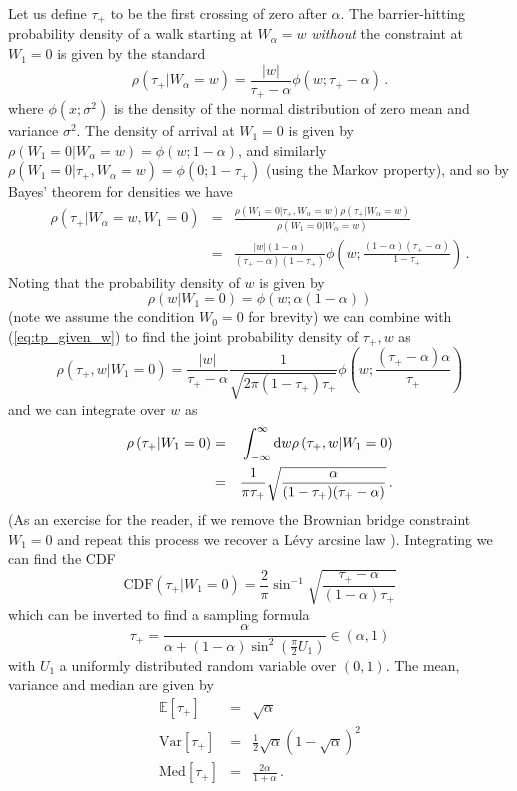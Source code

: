 \documentclass{article}
\newcommand{\tp}{{\tau_{\mathrm{+}}}}
\newcommand{\Var}{\mathrm{Var}}
\newcommand{\Med}{\mathrm{Med}}
\begin{document}
Let us define $\tp$ to be the first crossing of zero after $\alpha$. The barrier-hitting probability density of a walk starting at $W_\alpha=w$ \emph{without} the constraint at $W_1=0$ is given by the standard
\begin{equation}
\rho\left(\tp | W_\alpha=w\right) = \frac{|w|}{\tp - \alpha}\phi\left(w;\tp - \alpha \right) \, .
\end{equation}
where $\phi(x;\sigma^2)$ is the density of the normal distribution of zero mean and variance $\sigma^2$.
The density of arrival at $W_1=0$ is given by $\rho\left(W_1=0|W_\alpha=w\right) = \phi(w;1-\alpha)$, and similarly $\rho\left(W_1=0|\tp,W_\alpha=w\right) = \phi(0;1-\tp)$ (using the Markov property), and so by Bayes' theorem for densities we have
\begin{eqnarray}
  \rho\left(\tp | W_\alpha=w,W_1=0\right) &=& \frac{\rho(W_1=0|\tp,W_\alpha=w) \rho(\tp|W_\alpha=w)}{\rho(W_1=0|W_\alpha=w)} \\
&=&    \frac{|w|(1-\alpha)}{(\tp-\alpha)(1-\tp)}\phi\left(w;\frac{(1-\alpha)(\tp-\alpha)}{1-\tp}\right) \label{eq:tp_given_w} \,.
\end{eqnarray}
Noting that the probability density of $w$ is given by
\begin{equation}
\rho(w|W_1=0) = \phi\left(w;\alpha(1-\alpha)\right)
\end{equation}
(note we assume the condition $W_0=0$ for brevity) we can combine with (\ref{eq:tp_given_w}) to find the joint probability density of $\tp,w$ as
\begin{equation}\label{eq:tp_and_w}
  \rho(\tp,w|W_1=0) = \frac{|w|}{\tp-\alpha} \frac{1}{\sqrt{2 \pi (1-\tp)\tp}}\phi\left(w;\frac{(\tp-\alpha)\alpha}{\tp}\right)
\end{equation}
and we can integrate over $w$ as
\begin{eqnarray}
  \rho\left(\tp | W_1=0\right) &=& \int_{-\infty}^\infty {\textrm d}w   \rho\left(\tp,w | W_1=0\right) \\
&=&    \frac{1}{\pi \tp}\sqrt{\frac{\alpha}{(1-\tp)(\tp-\alpha)}} \label{eq:tp} \,.
\end{eqnarray}
(As an exercise for the reader, if we remove the Brownian bridge constraint $W_1=0$ and repeat this process we recover a L\'evy arcsine law \cite{levy}).
Integrating we can find the CDF
\begin{equation}
\textrm{CDF}\left(\tp | W_1=0 \right) = \frac{2}{\pi}\sin^{-1}\sqrt{\frac{\tp-\alpha}{(1-\alpha)\tp}}
\end{equation}
which can be inverted to find a sampling formula
\begin{equation}\label{eq:tp_sample}
\tp = \frac{\alpha}{\alpha + (1-\alpha) \sin^2 \left( \frac{\pi}{2} U_1 \right)} \in \left(\alpha,1\right)
\end{equation}
with $U_1$ a uniformly distributed random variable over $(0,1)$. The mean, variance and median are given by
\begin{eqnarray}
\mathbb{E}\left[\tp\right] &=& \sqrt{\alpha} \\
\Var\left[\tp\right] &=& \frac{1}{2}\sqrt{\alpha}\left(1-\sqrt{\alpha}\right)^2  \\
\Med\left[\tp\right] &=& \frac{2\alpha}{1+\alpha}  \, .
\end{eqnarray}
\end{document}
